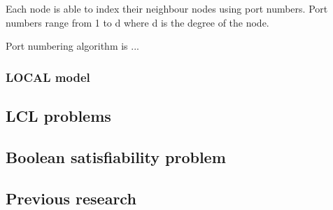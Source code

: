 Each node is able to index their neighbour nodes using port numbers.
Port numbers range from 1 to d where d is the degree of the node.



Port numbering algorithm is ...



\subsubsection{LOCAL model} \label{sec:local_model}

\subsection{LCL problems} \label{sec:lcl_problems}

\subsection{Boolean satisfiability problem}

\subsection{Previous research} \label{sec:previous_research}


\clearpage

